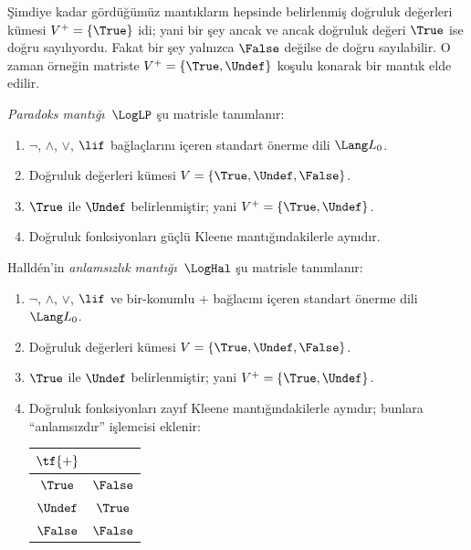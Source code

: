 



Şimdiye kadar gördüğümüz mantıkların hepsinde belirlenmiş doğruluk değerleri
kümesi $V^+ = \{\True\}$ idi; yani bir şey ancak ve ancak doğruluk değeri
$\True$ ise doğru sayılıyordu. Fakat bir şey yalnızca $\False$ değilse de
doğru sayılabilir. O zaman örneğin matriste
$V^+ = \{\True, \Undef\}$ koşulu konarak bir mantık elde edilir.

\begin{defn}
\emph{Paradoks mantığı}~$\LogLP$ şu matrisle tanımlanır:
\begin{enumerate}
  \item $\lnot$, $\land$, $\lor$, $\lif$ bağlaçlarını içeren standart
  önerme dili $\Lang L_0$.
  \item Doğruluk değerleri kümesi $V = \{\True, \Undef, \False\}$.
  \item $\True$ ile $\Undef$ belirlenmiştir; yani
  $V^+ = \{\True, \Undef\}$.
  \item Doğruluk fonksiyonları güçlü Kleene mantığındakilerle aynıdır.
\end{enumerate}
\end{defn}

\begin{defn}
Halld\'en'in \emph{anlamsızlık mantığı}~$\LogHal$ şu matrisle tanımlanır:
\begin{enumerate}
  \item $\lnot$, $\land$, $\lor$, $\lif$ ve bir-konumlu $+$ bağlacını
  içeren standart önerme dili $\Lang L_0$.
  \item Doğruluk değerleri kümesi $V = \{\True, \Undef, \False\}$.
  \item $\True$ ile $\Undef$ belirlenmiştir; yani
  $V^+ = \{\True, \Undef\}$.
  \item Doğruluk fonksiyonları zayıf Kleene mantığındakilerle aynıdır;
  bunlara “anlamsızdır” işlemcisi eklenir:
  \begin{center}
    \begin{tabular}{c|c} 
    $\tf{+}$ & \\ 
    \hline  
    $\True$ & $\False$ \\ 
    $\Undef$ & $\True$ \\
    $\False$ & $\False$ 
    \end{tabular}
  \end{center}
\end{enumerate}
\end{defn}

